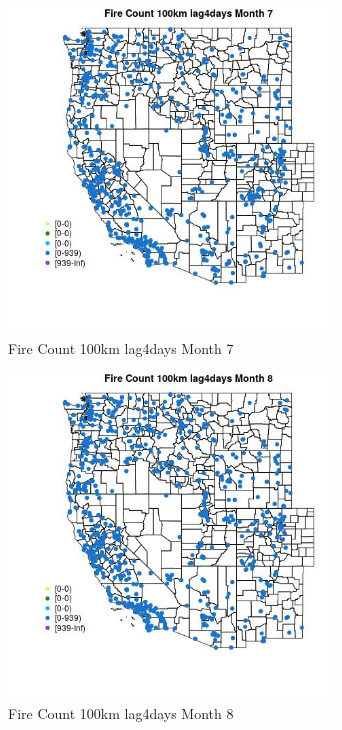 \begin{figure} 
\centering  
\includegraphics[width=0.77\textwidth]{Code_Outputs/Report_ML_input_PM25_Step4_part_e_de_duplicated_aves_compiled_2019-05-21wNAs_MapObsMo7Fire_Count_100km_lag4days.jpg} 
\caption{\label{fig:Report_ML_input_PM25_Step4_part_e_de_duplicated_aves_compiled_2019-05-21wNAsMapObsMo7Fire_Count_100km_lag4days}Fire Count 100km lag4days Month 7} 
\end{figure} 
 

\begin{figure} 
\centering  
\includegraphics[width=0.77\textwidth]{Code_Outputs/Report_ML_input_PM25_Step4_part_e_de_duplicated_aves_compiled_2019-05-21wNAs_MapObsMo8Fire_Count_100km_lag4days.jpg} 
\caption{\label{fig:Report_ML_input_PM25_Step4_part_e_de_duplicated_aves_compiled_2019-05-21wNAsMapObsMo8Fire_Count_100km_lag4days}Fire Count 100km lag4days Month 8} 
\end{figure} 
 

